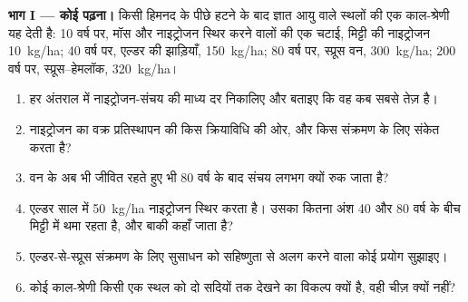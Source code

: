 \begin{problem}
\label{pb:b1:ecosystem-dynamics:1}

\medskip
\noindent\textbf{भाग I --- कोई  पढ़ना।}
किसी हिमनद के पीछे हटने के बाद ज्ञात आयु वाले स्थलों की एक काल-श्रेणी यह
देती है: 10 वर्ष पर, मॉस और नाइट्रोजन स्थिर करने वालों की एक चटाई,
मिट्टी की नाइट्रोजन \qty{10}{kg/ha}; 40 वर्ष पर, एल्डर की झाड़ियाँ,
\qty{150}{kg/ha}; 80 वर्ष पर, स्प्रूस वन, \qty{300}{kg/ha}; 200 वर्ष पर,
स्प्रूस--हेमलॉक, \qty{320}{kg/ha}।
\begin{enumerate}
  \item हर अंतराल में नाइट्रोजन-संचय की माध्य दर निकालिए और बताइए कि वह
        कब सबसे तेज़ है।
  \item नाइट्रोजन का वक्र प्रतिस्थापन की किस क्रियाविधि की ओर, और किस
        संक्रमण के लिए संकेत करता है?
  \item वन के अब भी जीवित रहते हुए भी 80 वर्ष के बाद संचय लगभग क्यों रुक
        जाता है?
  \item एल्डर साल में \qty{50}{kg/ha} नाइट्रोजन स्थिर करता है। उसका
        कितना अंश 40 और 80 वर्ष के बीच मिट्टी में थमा रहता है, और बाकी
        कहाँ जाता है?
  \item एल्डर-से-स्प्रूस संक्रमण के लिए सुसाधन को सहिष्णुता से अलग करने
        वाला कोई प्रयोग सुझाइए।
  \item कोई काल-श्रेणी किसी एक स्थल को दो सदियों तक देखने का विकल्प
        क्यों है, वही चीज़ क्यों नहीं?
\end{enumerate}


\end{problem}

